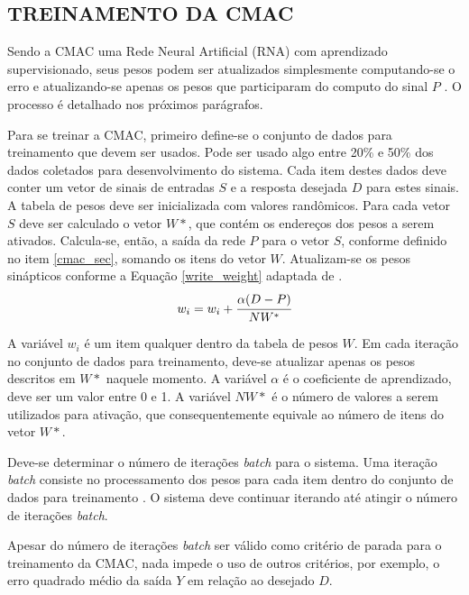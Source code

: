 \subsection{TREINAMENTO DA CMAC}
Sendo a CMAC uma Rede Neural Artificial (RNA) com aprendizado supervisionado, seus pesos podem ser atualizados simplesmente computando-se o erro e atualizando-se apenas os pesos que participaram do computo do sinal $P$ \cite{Haykin1998}. O processo é detalhado nos próximos parágrafos.

Para se treinar a CMAC, primeiro define-se o conjunto de dados para treinamento que devem ser usados. 
Pode ser usado algo entre 20\% e 50\% dos dados coletados para desenvolvimento do sistema. 
Cada item destes dados deve conter um vetor de sinais de entradas $S$ e a resposta desejada $D$ para estes sinais. 
A tabela de pesos deve ser inicializada com valores randômicos. 
Para cada vetor $S$ deve ser calculado o vetor $W*$, que contém os endereços dos pesos a serem ativados. 
Calcula-se, então, a saída da rede $P$ para o vetor $S$, conforme definido no item \ref{cmac_sec}, somando os itens do vetor $W$. 
Atualizam-se os pesos sinápticos conforme a Equação \ref{write_weight} adaptada de \cite{Sabourin2012a}.
\begin{equation}
	\label{write_weight}
	w_{i} = w_{i} + \cfrac{\alpha (D - P)}{NW^{*}}
\end{equation}

A variável $w_{i}$ é um item qualquer dentro da tabela de pesos $W$. 
Em cada iteração no conjunto de dados para treinamento, deve-se atualizar apenas os pesos descritos em $W*$ naquele momento. 
A variável $\alpha$ é o coeficiente de aprendizado, deve ser um valor entre 0 e 1. 
A variável $NW*$ é o número de valores a serem utilizados para ativação, que consequentemente equivale ao número de itens do vetor $W*$.

Deve-se determinar o número de iterações \emph{batch} para o sistema. 
Uma iteração \emph{batch} consiste no processamento dos pesos para cada item dentro do conjunto de dados para treinamento \cite{Ng2015}. 
O sistema deve continuar iterando até atingir o número de iterações \emph{batch}.

Apesar do número de iterações \emph{batch} ser válido como critério de parada para o treinamento da CMAC, nada impede o uso de outros critérios, por exemplo, o erro quadrado médio da saída $Y$ em relação ao desejado $D$.
